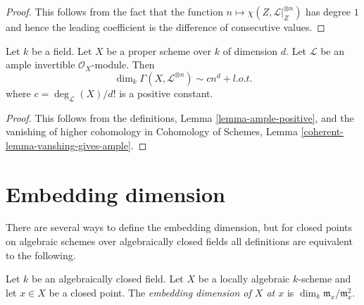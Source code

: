 \begin{proof}
This follows from the fact that the function
$n \mapsto \chi(Z, \mathcal{L}|_Z^{\otimes n})$ has degree $1$
and hence the leading coefficient is the difference of consecutive values.
\end{proof}

\begin{proposition}
\label{proposition-asymptotic-riemann-roch}
Let $k$ be a field. Let $X$ be a proper scheme over $k$ of dimension $d$.
Let $\mathcal{L}$ be an ample invertible $\mathcal{O}_X$-module.
Then
$$
\dim_k \Gamma(X, \mathcal{L}^{\otimes n}) \sim c n^d + l.o.t.
$$
where $c = \deg_\mathcal{L}(X)/d!$ is a positive constant.
\end{proposition}

\begin{proof}
This follows from the definitions,
Lemma \ref{lemma-ample-positive}, and the vanishing
of higher cohomology in
Cohomology of Schemes, Lemma \ref{coherent-lemma-vanshing-gives-ample}.
\end{proof}






\section{Embedding dimension}
\label{section-embedding-dimension}

\noindent
There are several ways to define the embedding dimension, but for
closed points on algebraic schemes over algebraically closed fields
all definitions are equivalent to the following.

\begin{definition}
\label{definition-embed-dim}
Let $k$ be an algebraically closed field. Let $X$ be a locally algebraic
$k$-scheme and let $x \in X$ be a closed point. The
{\it embedding dimension of $X$ at $x$} is
$\dim_k \mathfrak m_x/\mathfrak m_x^2$.
\end{definition}

